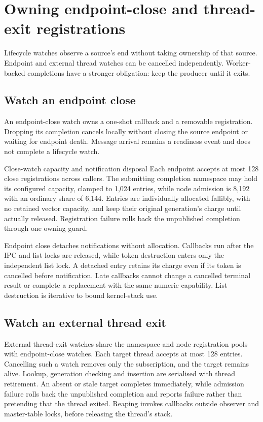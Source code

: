 \section{Owning endpoint-close and thread-exit registrations}

Lifecycle watches observe a source's end without taking ownership of that source.
Endpoint and external thread watches can be cancelled independently. Worker-backed
completions have a stronger obligation: keep the producer until it exits.

\subsection{Watch an endpoint close}

An endpoint-close watch owns a one-shot callback and a removable registration.
Dropping its completion cancels locally without closing the source endpoint or
waiting for endpoint death. Message arrival remains a readiness event and does
not complete a lifecycle watch.

\begin{implementationdetail}{Close-watch capacity and notification disposal}
Each endpoint accepts at most 128 close registrations across callers. The
submitting completion namespace may hold its configured capacity, clamped to
1,024 entries, while node admission is 8,192 with an ordinary share of 6,144. Entries
are individually allocated fallibly, with no retained vector capacity, and
keep their original generation's charge until actually released. Registration
failure rolls back the unpublished completion through one owning guard.

Endpoint close detaches notifications without allocation. Callbacks run after
the IPC and list locks are released, while token destruction enters only the
independent list lock. A detached entry retains its charge even if its token
is cancelled before notification. Late callbacks cannot change a cancelled
terminal result or complete a replacement with the same numeric capability.
List destruction is iterative to bound kernel-stack use.
\end{implementationdetail}

\subsection{Watch an external thread exit}

External thread-exit watches share the namespace and node registration pools
with endpoint-close watches. Each target thread accepts at most 128 entries.
Cancelling such a watch removes only the subscription, and the target remains
alive. Lookup, generation checking and insertion are serialised with thread
retirement. An absent or stale target completes immediately, while admission
failure rolls back the unpublished completion and reports failure rather than
pretending that the thread exited. Reaping invokes callbacks outside observer
and master-table locks, before releasing the thread's stack.


